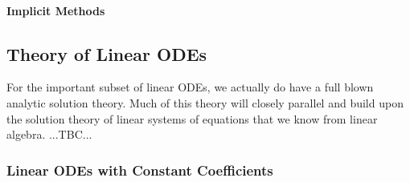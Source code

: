 \paragraph{Implicit Methods}



\subsection{Theory of Linear ODEs}
For the important subset of linear ODEs, we actually do have a full blown analytic solution theory. Much of this theory will closely parallel and build upon the solution theory of linear systems of equations that we know from linear algebra. ...TBC...



\subsubsection{Linear ODEs with Constant Coefficients}





\begin{comment}
-solving an ODE can be seen as a certain generalization of solving an integral - explain how
-give ODE of damped oscillator: f + a_1 f' + a_2 f'' = 0. For $a_1 = 0, a_2 = 1$ we get the ODE for exp, for $a_1 = -1, a_2 = 0$ we get the ODE for sin.

\end{comment}
